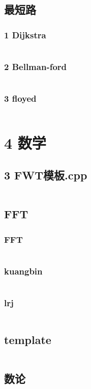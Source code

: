 \documentclass{article}
\begin{document}
\subsection{最短路}
\subsubsection{1 Dijkstra}
\inputminted{c++}{/home/zzuzxy/t2/Template1.0/3 图论/最短路/1 Dijkstra.cpp}
\subsubsection{2 Bellman-ford}
\inputminted{c++}{/home/zzuzxy/t2/Template1.0/3 图论/最短路/2 Bellman-ford.cpp}
\subsubsection{3 floyed}
\inputminted{c++}{/home/zzuzxy/t2/Template1.0/3 图论/最短路/3 floyed.cpp}
\section{4 数学}
\subsection{3 FWT模板.cpp}
\inputminted{c++}{/home/zzuzxy/t2/Template1.0/4 数学/3 FWT模板.cpp}
\subsection{FFT}
\subsubsection{FFT}
\inputminted{c++}{/home/zzuzxy/t2/Template1.0/4 数学/FFT/FFT.cpp}
\subsubsection{kuangbin}
\inputminted{c++}{/home/zzuzxy/t2/Template1.0/4 数学/FFT/kuangbin.cpp}
\subsubsection{lrj}
\inputminted{c++}{/home/zzuzxy/t2/Template1.0/4 数学/FFT/lrj.cpp}
\subsection{template}
\inputminted{c++}{/home/zzuzxy/t2/Template1.0/4 数学/Lagrange-poly/template.cpp}
\subsection{数论}
\end{document}
